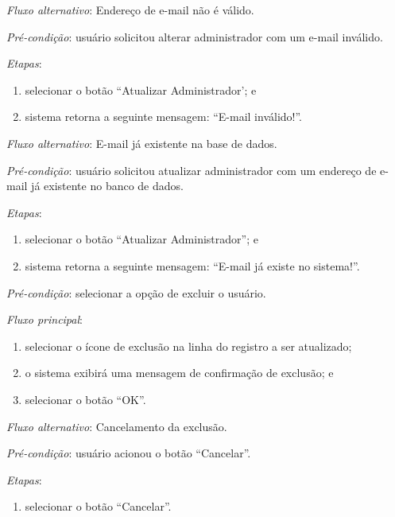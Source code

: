 \noindent \textit{Fluxo alternativo}: Endereço de e-mail não é válido.

\noindent \textit{Pré-condição}: usuário solicitou alterar administrador com um e-mail inválido.

\noindent \textit{Etapas}:

\begin{enumerate}
    \item selecionar o botão ``Atualizar Administrador'; e
    \item sistema retorna a seguinte mensagem: ``E-mail inválido!''.
\end{enumerate}


\noindent \textit{Fluxo alternativo}: E-mail já existente na base de dados.

\noindent \textit{Pré-condição}: usuário solicitou atualizar administrador com um endereço de e-mail já existente no banco de dados.

\noindent \textit{Etapas}:

\begin{enumerate}
    \item selecionar o botão ``Atualizar Administrador''; e
    \item sistema retorna a seguinte mensagem: ``E-mail já existe no sistema!''.
\end{enumerate}


\vspace{0.7cm}

\noindent \textit{Pré-condição}: selecionar a opção de excluir o usuário.

\noindent \textit{Fluxo principal}:

\begin{enumerate}
    \item selecionar o ícone de exclusão na linha do registro a ser atualizado;
    \item o sistema exibirá uma mensagem de confirmação de exclusão; e
    \item selecionar o botão ``OK''.
\end{enumerate}

\noindent \textit{Fluxo alternativo}: Cancelamento da exclusão.

\noindent \textit{Pré-condição}: usuário acionou o botão ``Cancelar''.

\noindent \textit{Etapas}:

\begin{enumerate}
    \item selecionar o botão ``Cancelar''.
\end{enumerate}


